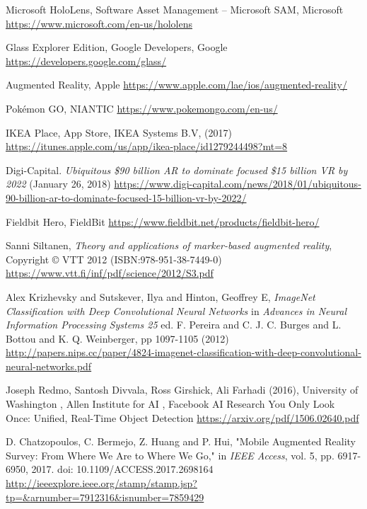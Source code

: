 
\begin{thebibliography}{X}

Microsoft HoloLens, Software Asset Management – Microsoft SAM, Microsoft
\url{https://www.microsoft.com/en-us/hololens}

Glass Explorer Edition, Google Developers, Google
\url{https://developers.google.com/glass/}


Augmented Reality, Apple
\url{https://www.apple.com/lae/ios/augmented-reality/}


Pokémon GO, NIANTIC
\url{https://www.pokemongo.com/en-us/}


IKEA Place, App Store, IKEA Systems B.V, (2017)
\url{https://itunes.apple.com/us/app/ikea-place/id1279244498?mt=8}

Digi-Capital. \textit{Ubiquitous  \$90 billion AR to dominate focused \$15 billion VR by 2022}
(January 26, 2018)
\url{https://www.digi-capital.com/news/2018/01/ubiquitous-90-billion-ar-to-dominate-focused-15-billion-vr-by-2022/}

Fieldbit Hero, FieldBit
\url{https://www.fieldbit.net/products/fieldbit-hero/}

Sanni Siltanen, \textit{Theory and applications of marker-based augmented reality},
Copyright © VTT 2012 (ISBN:978-951-38-7449-0)
\url{https://www.vtt.fi/inf/pdf/science/2012/S3.pdf}

Alex Krizhevsky and Sutskever, Ilya and Hinton, Geoffrey E, \textit{ImageNet Classification with Deep Convolutional Neural Networks} in \textit{Advances in Neural Information Processing Systems 25} ed. F. Pereira and C. J. C. Burges and L. Bottou and K. Q. Weinberger, pp 1097-1105 (2012)
\url{http://papers.nips.cc/paper/4824-imagenet-classification-with-deep-convolutional-neural-networks.pdf}

Joseph Redmo, Santosh Divvala, Ross Girshick, Ali Farhadi (2016), University of Washington
, Allen Institute for AI
, Facebook AI Research
You Only Look Once: Unified, Real-Time Object Detection
\url{https://arxiv.org/pdf/1506.02640.pdf} 


D. Chatzopoulos, C. Bermejo, Z. Huang and P. Hui, "Mobile Augmented Reality Survey: From Where We Are to Where We Go," in \textit{IEEE Access}, vol. 5, pp. 6917-6950, 2017.
doi: 10.1109/ACCESS.2017.2698164
\url{http://ieeexplore.ieee.org/stamp/stamp.jsp?tp=&arnumber=7912316&isnumber=7859429}



\end{thebibliography}
